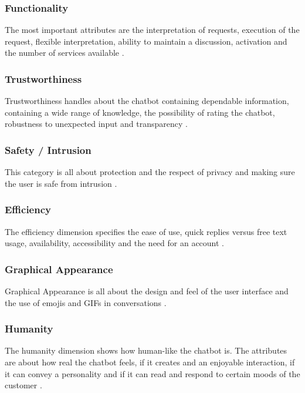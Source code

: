 \subsubsection{Functionality}
The most important attributes are the interpretation of requests, execution of the request, flexible interpretation, ability to maintain a discussion, activation and the number of services available \citep*{Muizzah2021, Verkeyn2018}.\\

\subsubsection{Trustworthiness}
Trustworthiness handles about the chatbot containing dependable information, containing a wide range of knowledge, the possibility of rating the chatbot, robustness to unexpected input and transparency \citep*{Muizzah2021, Verkeyn2018}.

\subsubsection{Safety / Intrusion}
This category is all about protection and the respect of privacy and making sure the user is safe from intrusion \citep*{Muizzah2021, Verkeyn2018}.\\

\subsubsection{Efficiency}
The efficiency dimension specifies the ease of use, quick replies versus free text usage, availability, accessibility and the need for an account \citep*{Muizzah2021, Verkeyn2018}.\\

\subsubsection{Graphical Appearance}
Graphical Appearance is all about the design and feel of the user interface and the use of emojis and GIFs in conversations \citep*{Muizzah2021, Verkeyn2018}.\\

\subsubsection{Humanity}
The humanity dimension shows how human-like the chatbot is. The attributes are about how real the chatbot feels, if it creates and an enjoyable interaction, if it can convey a personality and if it can read and respond to certain moods of the customer \citep*{Muizzah2021, Verkeyn2018}.\\

